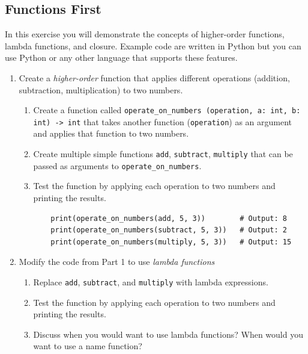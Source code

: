 \documentclass[oneside,11pt,dvipsnames]{book}
\newcommand{\code}[1]{\texttt{#1}}
\begin{document}
\subsection{Functions First}\label{exercise:functions-first}

In this exercise you will demonstrate the concepts of higher-order functions, lambda functions, and closure. Example code are written in Python but you can use Python or any other language that supports these features.

\begin{enumerate}
\item Create a \emph{higher-order} function that applies different operations (addition, subtraction, multiplication) to two numbers.
\begin{enumerate}
\item Create a function called \code{operate\_on\_numbers (operation, a: int, b: int) -> int} that takes another function (\code{operation}) as an argument and applies that function to two numbers.
\item Create multiple simple functions \code{add}, \code{subtract}, \code{multiply} that can be passed as arguments to \code{operate\_on\_numbers}.
\item Test the function by applying each operation to two numbers and printing the results.
\begin{lstlisting}
    print(operate_on_numbers(add, 5, 3))        # Output: 8
    print(operate_on_numbers(subtract, 5, 3))   # Output: 2
    print(operate_on_numbers(multiply, 5, 3))   # Output: 15
\end{lstlisting}

\end{enumerate}

\item Modify the code from Part 1 to use \emph{lambda functions} 
\begin{enumerate}
\item Replace \code{add}, \code{subtract}, and \code{multiply} with lambda expressions.
\item Test the function by applying each operation to two numbers and printing the results.
\item Discuss when you would want to use lambda functions? When would you want to use a name function?
\end{enumerate}


\end{enumerate}
\end{document}
